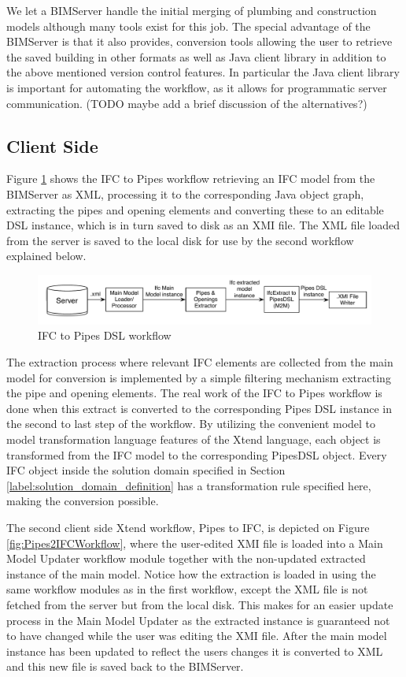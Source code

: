 We let a BIMServer handle the initial merging of plumbing and construction models although many tools exist for this job. The special advantage of the BIMServer is that it also provides, conversion tools allowing the user to retrieve the saved building in other formats as well as Java client library in addition to the above mentioned version control features. In particular the Java client library is important for automating the workflow, as it allows for programmatic server communication. (TODO maybe add a brief discussion of the alternatives?)

\subsection{Client Side}
Figure \ref{fig:IFC2PipesWorkflow} shows the IFC to Pipes workflow retrieving an IFC model from the BIMServer as XML, processing it to the corresponding Java object graph, extracting the pipes and opening elements and converting these to an editable DSL instance, which is in turn saved to disk as an XMI file. The XML file loaded from the server is saved to the local disk for use by the second workflow explained below.

\begin{figure}[htbp]
    \centering
        \includegraphics[width=120mm]{images/IFC2Pipes.pdf}
    \caption{IFC to Pipes DSL workflow}
    \label{fig:IFC2PipesWorkflow}
\end{figure}

The extraction process where relevant IFC elements are collected from the main model for conversion is implemented by a simple filtering mechanism extracting the pipe and opening elements. The real work of the IFC to Pipes workflow is done when this extract is converted to the corresponding Pipes DSL instance in the second to last step of the workflow. By utilizing the convenient model to model transformation language features of the Xtend language, each object is transformed from the IFC model to the corresponding PipesDSL object. Every IFC object inside the solution domain specified in Section \ref{label:solution_domain_definition} has a transformation rule specified here, making the conversion possible.

The second client side Xtend workflow, Pipes to IFC, is depicted on Figure \ref{fig:Pipes2IFCWorkflow}, where the user-edited XMI file is loaded into a Main Model Updater workflow module together with the non-updated extracted instance of the main model. Notice how the extraction is loaded in using the same workflow modules as in the first workflow, except the XML file is not fetched from the server but from the local disk. This makes for an easier update process in the Main Model Updater as the extracted instance is guaranteed not to have changed while the user was editing the XMI file. After the main model instance has been updated to reflect the users changes it is converted to XML and this new file is saved back to the BIMServer.

